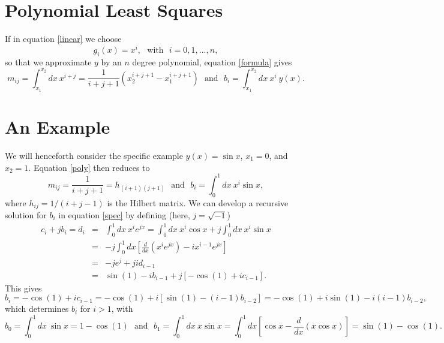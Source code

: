 \documentclass[10pt]{article}
\begin{document}
\section{Polynomial Least Squares}
\noindent If in equation \ref{linear} we choose
\begin{equation*}
g_i\left(x\right) = x^i, \ \ \ \mbox{with} \ \ \ i = 0, 1, ..., n,
\end{equation*}
\noindent so that we approximate $y$ by an $n$ degree polynomial, equation \ref{formula} gives
\begin{equation}\label{poly}
m_{i j} = \int_{x_1}^{x_2} dx \ x^{i + j} = \frac{1}{i + j + 1} \left(x_2^{i + j + 1} - x_1^{i + j + 1} \right) \ \ \ \mbox{and} \ \ \ b_i = \int_{x_1}^{x_2} dx \ x^i \ y\left(x\right).
\end{equation}
\section{An Example}
\noindent We will henceforth consider the specific example $y\left(x\right) = \sin x$, $x_1 = 0$, and $x_2 = 1$. Equation \ref{poly}  then reduces to
\begin{equation}\label{spec}
m_{i j} = \frac{1}{i + j + 1} = h_{\left(i+1\right)\left(j+1\right)} \ \ \ \mbox{and} \ \ \ b_i = \int_{0}^{1} dx \ x^i \sin x,
\end{equation}
\noindent where $h_{i j} = 1 / \left(i + j - 1\right)$ is the Hilbert matrix. We can develop a recursive solution for $b_i$  in equation \ref{spec} by defining (here, $j = \sqrt{-1}$)
\begin{eqnarray*}
c_i + j b_i = d_i &=& \int_0^1 dx \ x^i e^{j x} = \int_0^1 dx \ x^i \cos x + j \int_0^1 dx \ x^i \sin x \\
&=& - j \int_0^1 dx \left[\frac{d}{dx}\left(x^i e^{j x}\right) - i x^{i-1} e^{j x}\right] \\
&=& - j e^j + j i d_{i - 1} \\
&=& \sin \left(1\right) - i b_{i - 1} + j\left[-\cos\left(1\right) + i c_{i - 1}\right].
\end{eqnarray*}
\noindent This gives
\begin{equation}\label{b}
b_i = - \cos\left(1\right) + i c_{i - 1} = - \cos\left(1\right) + i \left[\sin\left(1\right) - \left(i-1\right) b_{i-2}\right] = - \cos\left(1\right) + i \sin\left(1\right) - i \left(i-1\right) b_{i-2},
\end{equation}
\noindent which determines $b_i$ for $i>1$, with
\begin{equation*}
b_0 = \int_0^1 dx \ \sin x = 1 - \cos\left(1\right) \ \ \ \mbox{and} \ \ \   b_1 = \int_0^1 dx \ x \sin x = \int_0^1 dx \left[\cos x - \frac{d}{dx}\left(x \cos x\right)\right] = \sin\left(1\right) - \cos\left(1\right).
\end{equation*}
\end{document}
